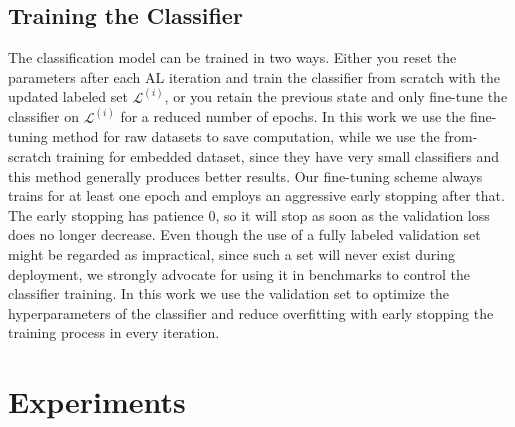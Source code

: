 \documentclass[]{article}
\begin{document}
\subsection{Training the Classifier}\label{sec:training_the_classifier}
The classification model can be trained in two ways. Either you reset the parameters after each AL iteration and train the classifier from scratch with the updated labeled set $\mathcal{L}^{(i)}$, or you retain the previous state and only fine-tune the classifier on $\mathcal{L}^{(i)}$ for a reduced number of epochs.
In this work we use the fine-tuning method for raw datasets to save computation, while we use the from-scratch training for embedded dataset, since they have very small classifiers and this method generally produces better results.
Our fine-tuning scheme always trains for at least one epoch and employs an aggressive early stopping after that.
The early stopping has patience 0, so it will stop as soon as the validation loss does no longer decrease.
Even though the use of a fully labeled validation set might be regarded as impractical, since such a set will never exist during deployment, we strongly advocate for using it in benchmarks to control the classifier training.
In this work we use the validation set to optimize the hyperparameters of the classifier and reduce overfitting with early stopping the training process in every iteration.

\section{Experiments}

\end{document}
